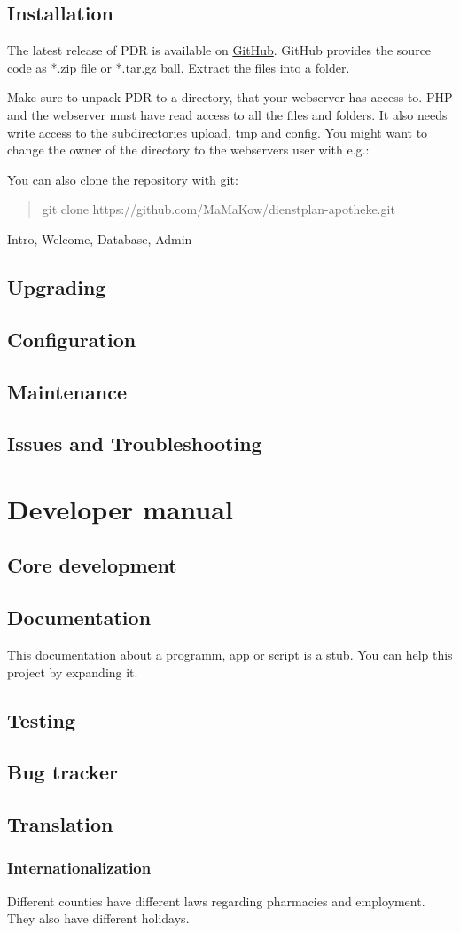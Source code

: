\documentclass[12pt,a4paper,titlepage]{report}
\begin{document}
\section{Installation}\label{sec:installation}
The latest release of PDR is available on \href{https://github.com/MaMaKow/dienstplan-apotheke/releases/latest}{GitHub}. GitHub provides the source code as *.zip file or *.tar.gz ball. Extract the files into a folder.

Make sure to unpack PDR to a directory, that your webserver has access to. PHP and the webserver must have read access to all the files and folders. It also needs write access to the subdirectories upload, tmp and config. You might want to change the owner of the directory to the webservers user with e.g.:

You can also clone the repository with git:
\begin{verse}
git clone https://github.com/MaMaKow/dienstplan-apotheke.git
\end{verse}

Intro, Welcome, Database, Admin

\section{Upgrading}
\section{Configuration}
\section{Maintenance}
\section{Issues and Troubleshooting}


\chapter{Developer manual}
\section{Core development}
\section{Documentation}
This documentation about a programm, app or script is a stub. You can help this project by expanding it.

\section{Testing}
\section{Bug tracker}
\section{Translation}
\subsection{Internationalization}
Different counties have different laws regarding pharmacies and employment. They also have different holidays.
\end{document}
